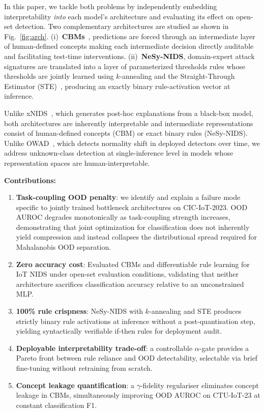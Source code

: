 \documentclass[journal]{IEEEtran}
\begin{document}
In this paper, we tackle both problems by independently embedding interpretability \emph{into} each model's architecture and evaluating its effect on open-set detection. Two complementary architectures are
studied as shown in Fig.~\ref{fig:arch}. (i)~\textbf{CBMs}~\cite{koh2020concept}, predictions are forced through an intermediate layer of human-defined concepts  making each intermediate decision directly auditable and facilitating test-time
interventions. (ii)~\textbf{NeSy-NIDS}, domain-expert attack signatures are translated into a layer of parameterized thresholds rules whose thresholds are jointly learned using $k$-annealing and the Straight-Through Estimator (STE)~\cite{bengio2013ste,liu2023reinmax}, producing an exactly binary rule-activation vector at inference.

Unlike xNIDS~\cite{wei2023xnids}, which generates post-hoc explanations from a black-box model, both architectures are inherently interpretable and intermediate representations consist of human-defined
concepts (CBM) or exact binary rules (NeSy-NIDS). Unlike OWAD~\cite{han2023owad}, which detects normality shift in deployed detectors over time, we address unknown-class detection at single-inference level in models whose representation spaces are human-interpretable.

\smallskip
\noindent\textbf{Contributions:}
\begin{enumerate}
  \item \textbf{Task-coupling OOD penalty}: we identify and explain a failure mode specific to jointly trained bottleneck architectures on CIC-IoT-2023. OOD AUROC degrades monotonically as task-coupling strength increases, demonstrating that joint optimization for classification does not inherently yield compression and instead collapses the distributional spread required for Mahalanobis OOD separation.
  \item \textbf{Zero accuracy cost}: Evaluated CBMs and differentiable rule learning for IoT NIDS under open-set evaluation conditions, validating that neither architecture sacrifices classification accuracy relative to an unconstrained MLP.
  \item \textbf{100\% rule crispness}: NeSy-NIDS with $k$-annealing and STE produces strictly binary rule activations at inference without a post-quantisation step, yielding syntactically verifiable if-then rules for deployment audit.
  \item \textbf{Deployable interpretability trade-off}: a controllable $\alpha$-gate provides a Pareto front between rule reliance and OOD detectability, selectable via brief fine-tuning without retraining from scratch.
  \item \textbf{Concept leakage quantification}: a $\gamma$-fidelity regulariser eliminates concept leakage in CBMs, simultaneously improving OOD AUROC on CTU-IoT-23 at constant classification F1.
\end{enumerate}
\end{document}
